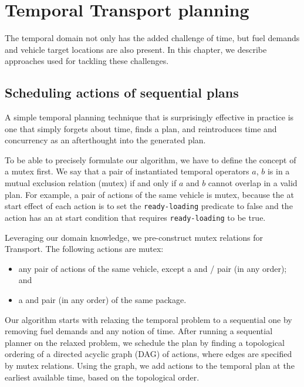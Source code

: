 \chapter{Temporal Transport planning}

The temporal domain not only has the added challenge of time,
but fuel demands and vehicle target locations are also present.
In this chapter, we describe approaches used
for tackling these challenges.















\section{Scheduling actions of sequential plans}\label{sched}

A simple temporal planning
technique that is surprisingly effective in practice
is one that simply forgets about time,
finds a plan, and reintroduces time and concurrency as an afterthought
into the generated plan.

To be able to precisely formulate our algorithm, we
have to define the concept of a mutex first.
We say that a pair of instantiated temporal operators $a$, $b$
is in a mutual exclusion relation (mutex)
if and only if $a$ and $b$
cannot overlap in a valid plan.
For example, a pair of \pickup{} actions 
of the same vehicle is mutex, because the
at start effect of each action is to 
set the \verb+ready-loading+
predicate to false and the action has an at start
condition that requires \verb+ready-loading+
to be true.

Leveraging our domain knowledge, we pre-construct mutex relations for Transport. The following actions are mutex:
\begin{itemize}
\item any pair of actions
of the same vehicle, except a  and \pickup{}/\drop{} pair (in any order); and
\item a \drop{} and \pickup{} pair (in any order)
of the same package.
\end{itemize}

Our algorithm starts with relaxing the temporal
problem to a sequential one by removing fuel demands
and any notion of time.
After running a sequential planner on the relaxed problem,
we schedule the plan by finding a
topological ordering of a directed acyclic graph (DAG)
of actions, where edges are specified by mutex relations.
Using the graph, we add actions to the temporal plan
at the earliest available time, based on the topological
order.

